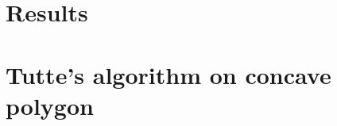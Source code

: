 \documentclass[12pt]{report}
\begin{document}
\chapter{Results}




\chapter{Tutte's algorithm on concave polygon}




\end{document}
